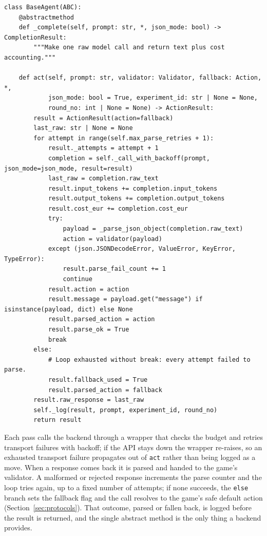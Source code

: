 \begin{lstlisting}[caption={The shared agent pipeline from \texttt{agents/base.py} (docstrings abridged): a backend implements only the raw model call, while \texttt{act} owns retrying, validation, fallback, and logging.}, label={lst:agent}]
class BaseAgent(ABC):
    @abstractmethod
    def _complete(self, prompt: str, *, json_mode: bool) -> CompletionResult:
        """Make one raw model call and return text plus cost accounting."""

    def act(self, prompt: str, validator: Validator, fallback: Action, *,
            json_mode: bool = True, experiment_id: str | None = None,
            round_no: int | None = None) -> ActionResult:
        result = ActionResult(action=fallback)
        last_raw: str | None = None
        for attempt in range(self.max_parse_retries + 1):
            result._attempts = attempt + 1
            completion = self._call_with_backoff(prompt, json_mode=json_mode, result=result)
            last_raw = completion.raw_text
            result.input_tokens += completion.input_tokens
            result.output_tokens += completion.output_tokens
            result.cost_eur += completion.cost_eur
            try:
                payload = _parse_json_object(completion.raw_text)
                action = validator(payload)
            except (json.JSONDecodeError, ValueError, KeyError, TypeError):
                result.parse_fail_count += 1
                continue
            result.action = action
            result.message = payload.get("message") if isinstance(payload, dict) else None
            result.parsed_action = action
            result.parse_ok = True
            break
        else:
            # Loop exhausted without break: every attempt failed to parse.
            result.fallback_used = True
            result.parsed_action = fallback
        result.raw_response = last_raw
        self._log(result, prompt, experiment_id, round_no)
        return result
\end{lstlisting}

Each pass calls the backend through a wrapper that checks the budget and retries
transport failures with backoff; if the API stays down the wrapper re-raises, so
an exhausted transport failure propagates out of \texttt{act} rather than being
logged as a move. When a response comes back it is parsed and handed to the game's
validator. A malformed or rejected response increments the parse counter and the
loop tries again, up to a fixed number of attempts; if none succeeds, the
\texttt{else} branch sets the fallback flag and the call resolves to the game's
safe default action (Section~\ref{sec:protocols}). That outcome, parsed or fallen
back, is logged before the result is returned, and the single abstract method is
the only thing a backend provides.

